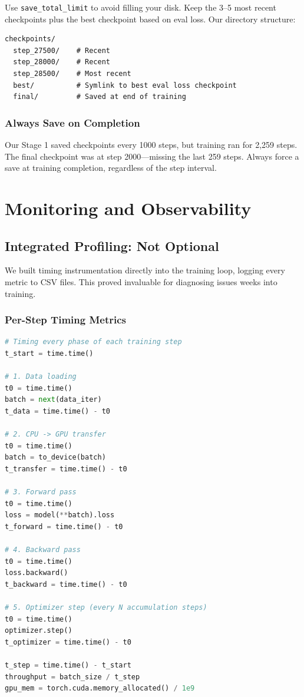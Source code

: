 \documentclass[11pt,a4paper]{article}
\begin{document}
Use \texttt{save\_total\_limit} to avoid filling your disk. Keep the 3--5 most recent checkpoints plus the best checkpoint based on eval loss. Our directory structure:

\begin{lstlisting}[caption=Checkpoint directory]
checkpoints/
  step_27500/    # Recent
  step_28000/    # Recent  
  step_28500/    # Most recent
  best/          # Symlink to best eval loss checkpoint
  final/         # Saved at end of training
\end{lstlisting}

\subsubsection{Always Save on Completion}

Our Stage 1 saved checkpoints every 1000 steps, but training ran for 2,259 steps. The final checkpoint was at step 2000---missing the last 259 steps. Always force a save at training completion, regardless of the step interval.

\section{Monitoring and Observability}

\subsection{Integrated Profiling: Not Optional}

We built timing instrumentation directly into the training loop, logging every metric to CSV files. This proved invaluable for diagnosing issues weeks into training.

\subsubsection{Per-Step Timing Metrics}

\begin{lstlisting}[language=Python,caption=Profiling instrumentation in the training loop]
# Timing every phase of each training step
t_start = time.time()

# 1. Data loading
t0 = time.time()
batch = next(data_iter)
t_data = time.time() - t0

# 2. CPU -> GPU transfer
t0 = time.time()
batch = to_device(batch)
t_transfer = time.time() - t0

# 3. Forward pass
t0 = time.time()
loss = model(**batch).loss
t_forward = time.time() - t0

# 4. Backward pass
t0 = time.time()
loss.backward()
t_backward = time.time() - t0

# 5. Optimizer step (every N accumulation steps)
t0 = time.time()
optimizer.step()
t_optimizer = time.time() - t0

t_step = time.time() - t_start
throughput = batch_size / t_step
gpu_mem = torch.cuda.memory_allocated() / 1e9
\end{lstlisting}
\end{document}
